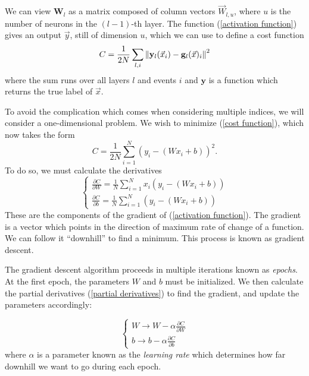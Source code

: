 \documentclass[10pt,a4paper]{book}
\begin{document}
We can view $\mathbf{W}_l$ as a matrix composed of column vectors $\vec{W}_{l,u}$, where $u$ is the number of neurons in the $(l-1)$-th layer. The function (\ref{activation function}) gives an output $\vec{y}$, still of dimension $u$, which we can use to define a cost function
\begin{equation}
C = \frac{1}{2N} \sum_{l, i} \norm{\mathbf{y}_l(\vec{x}_i) - \mathbf{g}_l(\vec{x})_i}^2
\label{cost function}
\end{equation}
where the sum runs over all layers $l$ and events $i$ and $\mathbf{y}$ is a function which returns the true label of $\vec{x}$.

To avoid the complication which comes when considering multiple indices, we will consider a one-dimensional problem. We wish to minimize (\ref{cost function}), which now takes the form
\begin{equation}
C = \frac{1}{2N}\sum_{i = 1}^N (y_i - (Wx_i + b))^2.
\end{equation}
To do so, we must calculate the derivatives
\begin{equation}
\begin{cases}
\frac{\partial C}{\partial W} = \frac{1}{N}\sum_{i = 1}^N x_i(y_i - (Wx_i + b)) \\
\frac{\partial C}{\partial b} = \frac{1}{N}\sum_{i = 1}^N (y_i - (Wx_i + b))
\end{cases}
\label{partial derivatives}
\end{equation}
These are the components of the gradient of (\ref{activation function}). The gradient is a vector which points in the direction of maximum rate of change of a function. We can follow it ``downhill'' to find a minimum. This process is known as gradient descent. 

The gradient descent algorithm proceeds in multiple iterations known as \emph{epochs}. At the first epoch, the parameters $W$ and $b$ must be initialized. We then calculate the partial derivatives (\ref{partial derivatives}) to find the gradient, and update the parameters accordingly:

\begin{equation}
\begin{cases}
W \rightarrow W - \alpha\frac{\partial C}{\partial W} \\
b \rightarrow b - \alpha\frac{\partial C}{\partial b}
\end{cases}
\end{equation}
where $\alpha$ is a parameter known as the \emph{learning rate} which determines how far downhill we want to go during each epoch.
\end{document}
